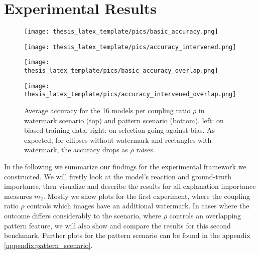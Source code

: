 \chapter{Experimental Results}\label{chapter:results}

\begin{figure}[ht!]
    \centering
    \begin{minipage}{0.49\textwidth}
    \texttt{[image: thesis\_latex\_template/pics/basic\_accuracy.png]}
    \end{minipage}
    \begin{minipage}{0.49\textwidth}
    \texttt{[image: thesis\_latex\_template/pics/accuracy\_intervened.png]}
    \end{minipage}
    
    \begin{minipage}{0.49\textwidth}
    \texttt{[image: thesis\_latex\_template/pics/basic\_accuracy\_overlap.png]}
    \end{minipage}
    \begin{minipage}{0.49\textwidth}
    \texttt{[image: thesis\_latex\_template/pics/accuracy\_intervened\_overlap.png]}
    \end{minipage}
    \caption[Accuracies]{Average accuracy for the 16 models per coupling ratio $\rho$ in watermark scenario (top) and pattern scenario (bottom). left: on biased training data, right: on selection going against bias. As expected, for ellipses without watermark and rectangles with watermark, the accuracy drops as $\rho$ raises.}
    \label{fig:accuracy}
\end{figure}

In the following we summarize our findings for the experimental framework we constructed. We will firstly look at the model's reaction and ground-truth importance, then visualize and describe the results for all explanation importance measures $m_2$.
Mostly we show plots for the first experiment, where the coupling ratio $\rho$ controls which images have an additional watermark. In cases where the outcome differs considerably to the scenario, where $\rho$ controls an overlapping pattern feature, we will also show and compare the results for this second benchmark. Further plots for the pattern scenario can be found in the appendix \cref{appendix:pattern_scenario}.

